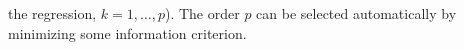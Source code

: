 \documentclass[11pt,a4paper]{article}
\begin{document}
\begin{itemize}
\begin{enumerate}
the regression, $k=1, \ldots, p$). The order $p$ can be selected automatically by minimizing some information criterion.
\end{enumerate}

\end{itemize}
\newpage
\end{document}
